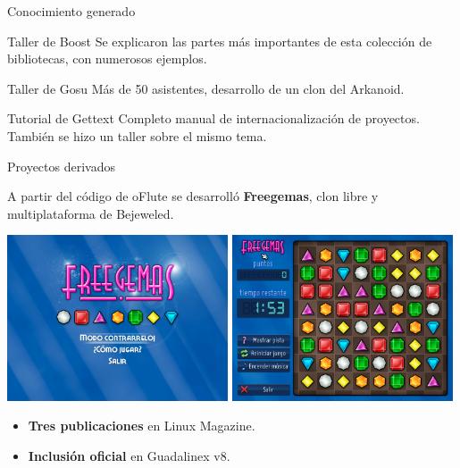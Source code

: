 \begin{frame}{Conocimiento generado}
  \pause

  \begin{block}{Taller de Boost}
    Se explicaron las partes más importantes de esta colección de bibliotecas,
    con numerosos ejemplos.
  \end{block}

  \pause

  \begin{block}{Taller de Gosu}
    Más de 50 asistentes, desarrollo de un clon del Arkanoid.
  \end{block}

  \pause

  \begin{block}{Tutorial de Gettext}
    Completo manual de internacionalización de proyectos. También se hizo un
    taller sobre el mismo tema.
  \end{block}
\end{frame}

\begin{frame}{Proyectos derivados}

  \begin{center}
    A partir del código de oFlute se desarrolló \textbf{Freegemas}, clon
    libre y multiplataforma de Bejeweled.

    \medskip

    \includegraphics[width=0.49\textwidth]{imagenes/imagen_freegemas1}\hspace{0.1cm}
    \includegraphics[width=0.49\textwidth]{imagenes/imagen_freegemas2}

    \medskip

    \begin{itemize}
    \item \textbf{Tres publicaciones} en Linux Magazine.
    \item \textbf{Inclusión oficial} en Guadalinex v8.
    \end{itemize}
  \end{center}
\end{frame}

